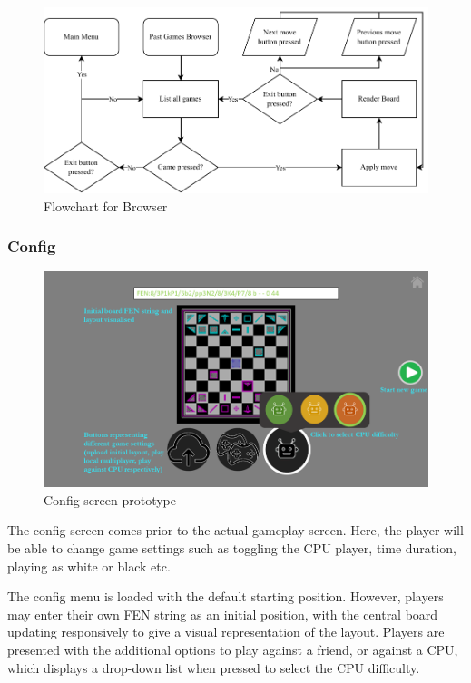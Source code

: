 \documentclass[../main/main.tex]{subfiles}
\begin{document}
\begin{figure}[ht!]
    \centering
    \includegraphics[width=\columnwidth]{../design/assets/browser_flowchart.pdf}
    \caption{Flowchart for Browser}
    \label{fig:browser-flowchart}
\end{figure}

\subsubsection{Config}
\begin{figure}[ht!]
    \centering
    \includegraphics[width=0.8\columnwidth]{../design/assets/config_gui.png}
    \caption{Config screen prototype}
    \label{fig:config-gui}
\end{figure}

The config screen comes prior to the actual gameplay screen. Here, the player will be able to change game settings such as toggling the CPU player, time duration, playing as white or black etc.

The config menu is loaded with the default starting position. However, players may enter their own FEN string as an initial position, with the central board updating responsively to give a visual representation of the layout. Players are presented with the additional options to play against a friend, or against a CPU, which displays a drop-down list when pressed to select the CPU difficulty.
\end{document}
